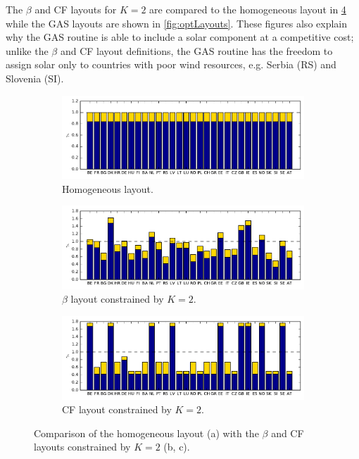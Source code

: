 \documentclass[a4paper, 5p, sort&compress]{elsarticle}%
\newcommand{\chromowidth}{1.00 \columnwidth}
\begin{document}
The $\beta$
and CF layouts for $K=2$
are compared to the homogeneous layout in \cref{fig:k=2layouts} while the GAS layouts are shown
in \cref{fig:optLayouts}. %
These figures also explain why the GAS routine is able to include a solar component at a
competitive cost; unlike the $\beta$
and CF layout definitions, the GAS routine has the freedom to assign solar only to countries
with poor wind resources, e.g. Serbia (RS) and Slovenia (SI).


\begin{figure}[p!]
  \centering
  \begin{subfigure}{2\columnwidth}
    \includegraphics[width = \chromowidth, center]{chromosome_homogeneous}
    \caption{Homogeneous layout.}
    \label{fig:betaOpt}
  \end{subfigure}
  \begin{subfigure}{2\columnwidth}
    \includegraphics[width = \chromowidth, center]{chromosome_k=2beta}
    \caption{$\beta$ layout constrained by $K = 2$.}
    \label{fig:cfMaxOpt}
  \end{subfigure}
  \begin{subfigure}{2\columnwidth}
    \includegraphics[width = \chromowidth, center]{chromosome_k=2cfMax}
    \caption{CF layout constrained by $K = 2$.}
    \label{fig:agdOpt}
  \end{subfigure}
  \caption{Comparison of the homogeneous layout (a) with the $\beta$
    and CF layouts constrained by $K = 2$ (b, c). }
  \label{fig:k=2layouts}
\end{figure}
\end{document}
